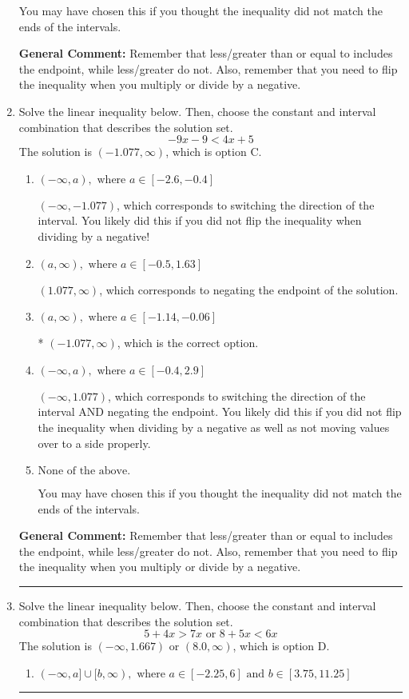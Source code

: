 \documentclass{extbook}[14pt]
\newcommand{\litem}[1]{\item #1

\rule{\textwidth}{0.4pt}}
\begin{document}
\begin{enumerate}
{\begin{enumerate}[label=\Alph*.]
You may have chosen this if you thought the inequality did not match the ends of the intervals.
\end{enumerate}

\textbf{General Comment:} Remember that less/greater than or equal to includes the endpoint, while less/greater do not. Also, remember that you need to flip the inequality when you multiply or divide by a negative.
}
\litem{
Solve the linear inequality below. Then, choose the constant and interval combination that describes the solution set.
\[ -9x -9 < 4x + 5 \]The solution is \( (-1.077, \infty) \), which is option C.\begin{enumerate}[label=\Alph*.]
\item \( (-\infty, a), \text{ where } a \in [-2.6, -0.4] \)

 $(-\infty, -1.077)$, which corresponds to switching the direction of the interval. You likely did this if you did not flip the inequality when dividing by a negative!
\item \( (a, \infty), \text{ where } a \in [-0.5, 1.63] \)

 $(1.077, \infty)$, which corresponds to negating the endpoint of the solution.
\item \( (a, \infty), \text{ where } a \in [-1.14, -0.06] \)

* $(-1.077, \infty)$, which is the correct option.
\item \( (-\infty, a), \text{ where } a \in [-0.4, 2.9] \)

 $(-\infty, 1.077)$, which corresponds to switching the direction of the interval AND negating the endpoint. You likely did this if you did not flip the inequality when dividing by a negative as well as not moving values over to a side properly.
\item \( \text{None of the above}. \)

You may have chosen this if you thought the inequality did not match the ends of the intervals.
\end{enumerate}

\textbf{General Comment:} Remember that less/greater than or equal to includes the endpoint, while less/greater do not. Also, remember that you need to flip the inequality when you multiply or divide by a negative.
}
\litem{
Solve the linear inequality below. Then, choose the constant and interval combination that describes the solution set.
\[ 5 + 4 x > 7 x \text{ or } 8 + 5 x < 6 x \]The solution is \( (-\infty, 1.667) \text{ or } (8.0, \infty) \), which is option D.\begin{enumerate}[label=\Alph*.]
\item \( (-\infty, a] \cup [b, \infty), \text{ where } a \in [-2.25, 6] \text{ and } b \in [3.75, 11.25] \)


\end{enumerate}}
\end{enumerate}
\end{document}
